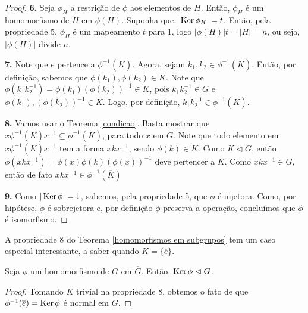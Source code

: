 \begin{proof}
		\par\vspace{0.3cm}\hspace{17pt}\textbf{6.} Seja $\phi_H$ a restrição de $\phi$ aos elementos de $H$.
		Então, $\phi_H$ é um homomorfismo de $H$ em $\phi(H)$. Suponha que $|\operatorname{Ker}\phi_H| = t$. Então, pela
		propriedade 5, $\phi_H$ é um mapeamento $t$ para 1, logo $|\phi(H)|t = |H| = n$, ou seja, 
		$|\phi(H)|$ divide $n$.
		
		\par\vspace{0.3cm}\hspace{17pt}\textbf{7.} Note que $e$ pertence a $\phi^{-1}(\overline{K})$. 
		Agora, sejam $k_1, k_2\in \phi^{-1}(\overline{K})$. Então, por definição, sabemos que 
		$\phi(k_1), \phi(k_2)\in\overline{K}$. Note que 
		$\phi(k_1k_2^{-1}) = \phi(k_1)(\phi(k_2))^{-1}\in\overline{K}$, pois $k_1k_2^{-1}\in G$ 
		e $\phi(k_1),(\phi(k_2))^{-1}\in\overline{K}$. Logo, por definição,
		$k_1k_2^{-1}\in\phi^{-1}(\overline{K})$. 	
		
		\par\vspace{0.3cm}\hspace{17pt}\textbf{8.} Vamos usar o Teorema \ref{condicao}. 
		Basta mostrar que $x\phi^{-1}(\overline{K})x^{-1}\subseteq\phi^{-1}(\overline{K})$, 
		para todo $x$ em $G$. Note que todo elemento em $x\phi^{-1}(\overline{K})x^{-1}$ tem a forma 
		$xkx^{-1}$, sendo $\phi(k)\in\overline{K}$. Como $\overline{K}\vartriangleleft\overline{G}$, 
		então $\phi(xkx^{-1}) = \phi(x)\phi(k)(\phi(x))^{-1}$ deve pertencer a $\overline{K}$. 
		Como $xkx^{-1}\in G$, então de fato $xkx^{-1}\in\phi^{-1}(\overline{K})$
		
		\par\vspace{0.3cm}\hspace{17pt}\textbf{9.} Como $|\operatorname{Ker}\phi| = 1$, sabemos, pela propriedade 5, 
		que $\phi$ é injetora. Como, por hipótese, $\phi$ é sobrejetora e, por definição $\phi$ preserva 
		a operação, concluímos que $\phi$ é isomorfismo.
	\end{proof}
	A propriedade 8 do Teorema \ref{homomorfismos em subgrupos} tem um caso especial
	interessante, a saber quando $\overline{K} = \{\overline{e}\}$.
	\begin{corollary}
	\label{nucleo normal}
		Seja $\phi$ um homomorfismo de $G$ em $\overline{G}$. Então, $\operatorname{Ker}\phi\vartriangleleft G$. 
	\end{corollary}
	\begin{proof}
		Tomando $\overline{K}$ trivial na propriedade 8, obtemos o fato de que 
		$\phi^{-1}(\overline{e}) = \operatorname{Ker}\phi$ é normal em $G$.
	\end{proof}
